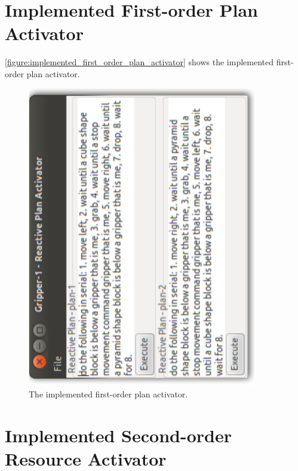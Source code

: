 \section{Implemented First-order Plan Activator}

{\mbox{\autoref{figure:implemented_first_order_plan_activator}}} shows
the implemented first-order plan activator.
\begin{figure}
\includegraphics[width=10cm]{gfx/implemented_first_order_plan_activator}
\caption[The implemented first-order plan activator.]{The implemented
  first-order plan activator.}
\label{figure:implemented_first_order_plan_activator}
\end{figure}

\section{Implemented Second-order Resource Activator}

